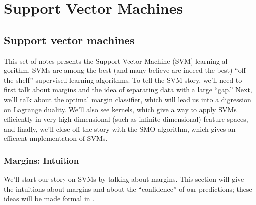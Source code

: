 \titlespacing*{\part}{0pt}{-20pt}{30pt} %
\titlespacing*{\chapter}{0pt}{-10pt}{30pt}

\part{Support Vector Machines}
\label{part:svms}


{\let\cleardoublepage\relax \chapter{Support vector machines}}
This set of notes presents the Support Vector Machine (SVM) learning al-
gorithm. SVMs are among the best (and many believe are indeed the best)
``off-the-shelf'' supervised learning algorithms. To tell the SVM story, we'll
need to first talk about margins and the idea of separating data with a large
``gap.'' Next, we'll talk about the optimal margin classifier, which will lead
us into a digression on Lagrange duality. We'll also see kernels, which give
a way to apply SVMs efficiently in very high dimensional (such as infinite-dimensional)
feature spaces, and finally, we'll close off the story with the
SMO algorithm, which gives an efficient implementation of SVMs.

\section{Margins: Intuition}
We'll start our story on SVMs by talking about margins. This section will
give the intuitions about margins and about the ``confidence'' of our predictions;
these ideas will be made formal in .

